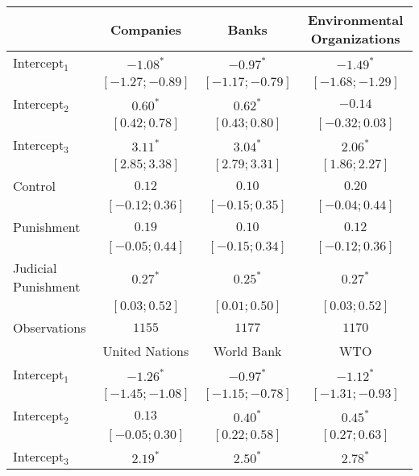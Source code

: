 \begin{table}[h]
\begin{center}
\begin{threeparttable}
\begin{tabular}{l c c c}
\hline
 & Companies & Banks & Environmental
Organizations \\
\hline
Intercept$_1$       & $-1.08^{*}$       & $-0.97^{*}$       & $-1.49^{*}$       \\
                    & $ [-1.27; -0.89]$ & $ [-1.17; -0.79]$ & $ [-1.68; -1.29]$ \\
Intercept$_2$       & $0.60^{*}$        & $0.62^{*}$        & $-0.14$           \\
                    & $ [ 0.42;  0.78]$ & $ [ 0.43;  0.80]$ & $ [-0.32;  0.03]$ \\
Intercept$_3$       & $3.11^{*}$        & $3.04^{*}$        & $2.06^{*}$        \\
                    & $ [ 2.85;  3.38]$ & $ [ 2.79;  3.31]$ & $ [ 1.86;  2.27]$ \\
Control             & $0.12$            & $0.10$            & $0.20$            \\
                    & $ [-0.12;  0.36]$ & $ [-0.15;  0.35]$ & $ [-0.04;  0.44]$ \\
Punishment          & $0.19$            & $0.10$            & $0.12$            \\
                    & $ [-0.05;  0.44]$ & $ [-0.15;  0.34]$ & $ [-0.12;  0.36]$ \\
Judicial Punishment & $0.27^{*}$        & $0.25^{*}$        & $0.27^{*}$        \\
                    & $ [ 0.03;  0.52]$ & $ [ 0.01;  0.50]$ & $ [ 0.03;  0.52]$ \\
\hline
Observations        & $1155$            & $1177$            & $1170$            \\
\hline
 & United Nations & World Bank & WTO \\
\hline
Intercept$_1$       & $-1.26^{*}$       & $-0.97^{*}$       & $-1.12^{*}$       \\
                    & $ [-1.45; -1.08]$ & $ [-1.15; -0.78]$ & $ [-1.31; -0.93]$ \\
Intercept$_2$       & $0.13$            & $0.40^{*}$        & $0.45^{*}$        \\
                    & $ [-0.05;  0.30]$ & $ [ 0.22;  0.58]$ & $ [ 0.27;  0.63]$ \\
Intercept$_3$       & $2.19^{*}$        & $2.50^{*}$        & $2.78^{*}$        \\

\end{tabular}
\end{threeparttable}
\end{center}
\end{table}
